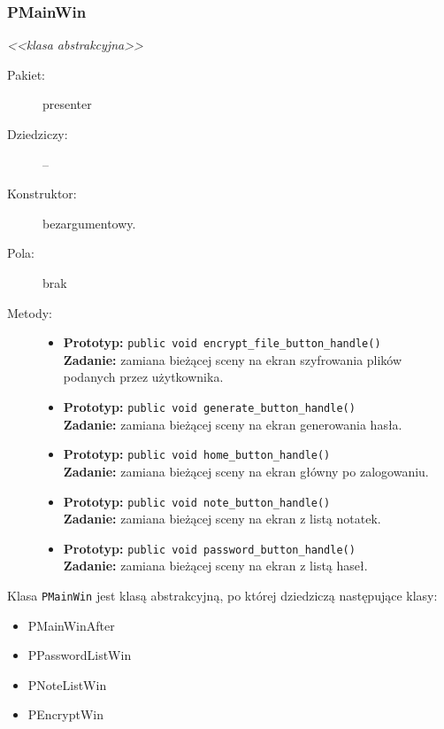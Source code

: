 \documentclass[a4paper]{article}
\newcommand{\prog}{\texttt}
\begin{document}
\subsubsection{PMainWin}
\textit{<<klasa abstrakcyjna>>}
\begin{description}
    \item[Pakiet:] presenter
    \item[Dziedziczy:] --
    \item[Konstruktor:] bezargumentowy.
    \item[Pola:]brak
    \item[Metody:] \hfill
    \begin{itemize}
        \item \textbf{Prototyp:} \prog{public void encrypt\_file\_button\_handle()}\\\textbf{Zadanie:} zamiana bieżącej sceny na ekran szyfrowania plików podanych przez użytkownika.
        \item \textbf{Prototyp:} \prog{public void generate\_button\_handle()}\\\textbf{Zadanie:} zamiana bieżącej sceny na ekran generowania hasła.
        \item \textbf{Prototyp:} \prog{public void home\_button\_handle()}\\\textbf{Zadanie:} zamiana bieżącej sceny na ekran główny po zalogowaniu.
        \item \textbf{Prototyp:} \prog{public void note\_button\_handle()}\\\textbf{Zadanie:} zamiana bieżącej sceny na ekran z listą notatek.
        \item \textbf{Prototyp:} \prog{public void password\_button\_handle()}\\\textbf{Zadanie:} zamiana bieżącej sceny na ekran z listą haseł.
    \end{itemize}
\end{description}
Klasa \prog{PMainWin} jest klasą abstrakcyjną, po której dziedziczą następujące klasy:
\begin{itemize}
    \item PMainWinAfter
    \item PPasswordListWin
    \item PNoteListWin
    \item PEncryptWin
\end{itemize}
\end{document}
